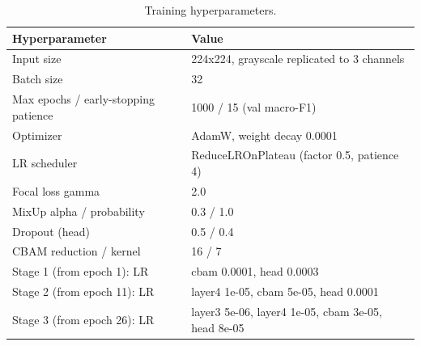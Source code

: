 \begin{table}[ht]
\centering
\small
\caption{Training hyperparameters.}
\label{tab:hyperparameters}
\begin{tabular}{ll}
\toprule
Hyperparameter & Value \\
\midrule
Input size & 224x224, grayscale replicated to 3 channels \\
Batch size & 32 \\
Max epochs / early-stopping patience & 1000 / 15 (val macro-F1) \\
Optimizer & AdamW, weight decay 0.0001 \\
LR scheduler & ReduceLROnPlateau (factor 0.5, patience 4) \\
Focal loss gamma & 2.0 \\
MixUp alpha / probability & 0.3 / 1.0 \\
Dropout (head) & 0.5 / 0.4 \\
CBAM reduction / kernel & 16 / 7 \\
Stage 1 (from epoch 1): LR & cbam 0.0001, head 0.0003 \\
Stage 2 (from epoch 11): LR & layer4 1e-05, cbam 5e-05, head 0.0001 \\
Stage 3 (from epoch 26): LR & layer3 5e-06, layer4 1e-05, cbam 3e-05, head 8e-05 \\
\bottomrule
\end{tabular}
\end{table}